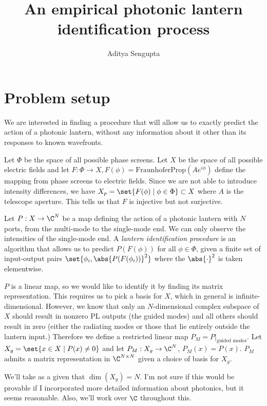 \documentclass{article}
\title{An empirical photonic lantern identification process}
\author{Aditya Sengupta}
\begin{document}
    \maketitle

    \section{Problem setup}
    We are interested in finding a procedure that will allow us to exactly predict the action of a photonic lantern, without any information about it other than its responses to known wavefronts.

    Let $\Phi$ be the space of all possible phase screens. Let $X$ be the space of all possible electric fields and let $F: \Phi \to X, F(\phi) = \text{FraunhoferProp}(A e^{i \phi})$ define the mapping from phase screens to electric fields. Since we are not able to introduce intensity differences, we have $X_p = \set{F(\phi) \mid \phi \in \Phi} \subset X$ where $A$ is the telescope aperture. This tells us that $F$ is injective but not surjective.

    Let $P: X \to \C^N$ be a map defining the action of a photonic lantern with $N$ ports, from the multi-mode to the single-mode end. We can only observe the intensities of the single-mode end. A \textit{lantern identification procedure} is an algorithm that allows us to predict $P(F(\phi))$ for all $\phi \in \Phi$, given a finite set of input-output pairs $\set{\phi_i, \abs{P(F(\phi_i))}^2}$ where the $\abs{\cdot}^2$ is taken elementwise.

    $P$ is a linear map, so we would like to identify it by finding its matrix representation. This requires us to pick a basis for $X$, which in general is infinite-dimensional. However, we know that only an $N$-dimensional complex subspace of $X$ should result in nonzero PL outputs (the guided modes) and all others should result in zero (either the radiating modes or those that lie entirely outside the lantern input.) Therefore we define a restricted linear map $P_M = \left.P\right|_{\text{guided modes}}$. Let $X_g = \set{x \in X \mid P(x) \neq 0}$ and let $P_M: X_g \to \C^N$, $P_M(x) = P(x)$. $P_M$ admits a matrix representation in $\C^{N \times N}$ given a choice of basis for $X_g$.

    We'll take as a given that $\dim(X_g) = N$. I'm not sure if this would be provable if I incorporated more detailed information about photonics, but it seems reasonable. Also, we'll work over $\C$ throughout this.
\end{document}
